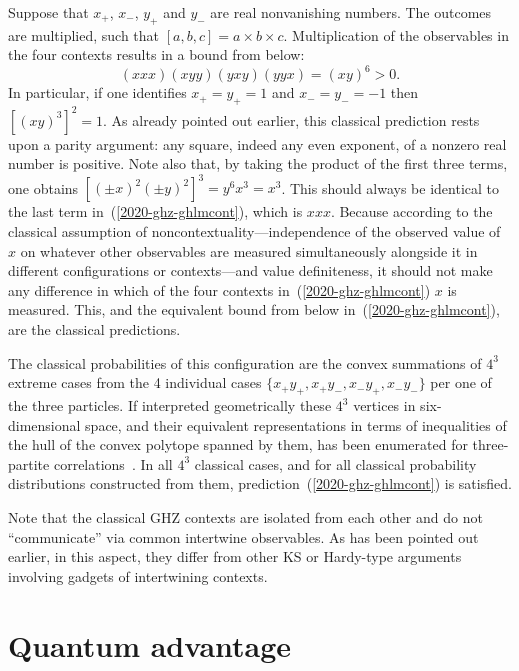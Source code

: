 \documentclass[sn-mathphys]{sn-jnl}%
\theoremstyle{thmstyleone}%
\theoremstyle{thmstyletwo}%
\theoremstyle{thmstylethree}%
\begin{document}
Suppose that $x_+$, $x_-$, $y_+$ and $y_-$ are real nonvanishing numbers.
The outcomes are multiplied, such that $[a,b,c]=a\times b\times c$.
Multiplication of the observables in the four contexts results in a bound from below:
\begin{equation}
({{x}}{{x}}{{x}})
({{x}}{{y}}{{y}})
({{y}}{{x}}{{y}})
({{y}}{{y}}{{x}})
 =
({{x}}{{y}})^6 >0.
\label{2020-ghz-ghlmcont}
\end{equation}
In particular, if one identifies $x_+=y_+=1$ and $x_-=y_-=-1$ then $[({{x}}{{y}})^3]^2 =1$.
As already pointed out earlier, this classical prediction rests upon a parity argument:
any square, indeed any even exponent, of a nonzero real number is positive.
Note also that, by taking the product of the first three terms,
one obtains $\left[(\pm x)^2(\pm y)^2\right]^3={{y}}^6  {{x}}^3 =  {{x}}^3 $.
This should always be identical to the last term  in~(\ref{2020-ghz-ghlmcont}),
which is ${{x}}{{x}}{{x}}$.
Because according to the classical assumption of noncontextuality---independence of the observed value of ${{x}}$
on whatever other observables are measured simultaneously alongside it in different configurations or contexts---and
value definiteness, it should not make any difference
in which of the four contexts in~(\ref{2020-ghz-ghlmcont})
${{x}}$ is measured.
This, and the equivalent bound from below
in~(\ref{2020-ghz-ghlmcont}), are the classical predictions.


The classical probabilities of this configuration are the convex summations of $4^3$ extreme cases
from the 4 individual cases
$\{x_+y_+,x_+y_-,x_-y_+,x_-y_-\}$
per one of the three particles.
If interpreted geometrically  these $4^3$ vertices in six-dimensional space,
and their equivalent representations in terms of inequalities of the hull of the
convex polytope spanned by them, has been enumerated for three-partite correlations~\cite{2000-poly}.
In all $4^3$ classical cases, and for all classical probability distributions constructed from them, prediction~(\ref{2020-ghz-ghlmcont}) is satisfied.

Note that the classical GHZ contexts are isolated from each other and do not ``communicate''
via common intertwine observables.
As has been pointed out earlier,
in this aspect, they differ from other KS or Hardy-type arguments involving gadgets of intertwining contexts.

\section{Quantum advantage}
\end{document}
